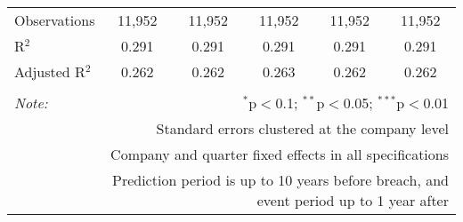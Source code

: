\begin{table}[!htbp]
\begin{tabular}{@{\extracolsep{5pt}}lccccc}
Observations & 11,952 & 11,952 & 11,952 & 11,952 & 11,952 \\ 
R$^{2}$ & 0.291 & 0.291 & 0.291 & 0.291 & 0.291 \\ 
Adjusted R$^{2}$ & 0.262 & 0.262 & 0.263 & 0.262 & 0.262 \\ 
\hline 
\hline \\[-1.8ex] 
\textit{Note:}  & \multicolumn{5}{r}{$^{*}$p$<$0.1; $^{**}$p$<$0.05; $^{***}$p$<$0.01} \\ 
 & \multicolumn{5}{r}{Standard errors clustered at the company level} \\ 
 & \multicolumn{5}{r}{Company and quarter fixed effects in all specifications} \\ 
 & \multicolumn{5}{r}{Prediction period is up to 10 years before breach, and event period up to 1 year after} \\ 
\end{tabular} 
\end{table} 
